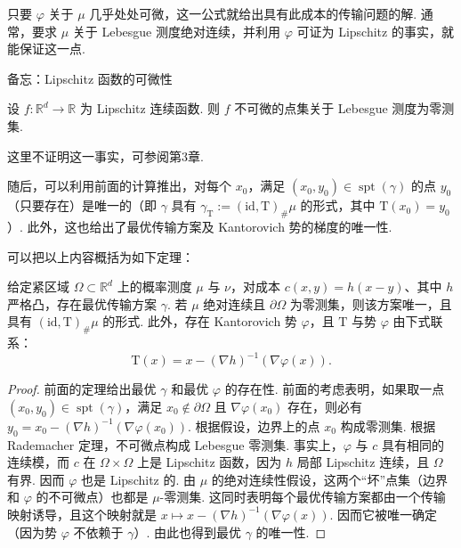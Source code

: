 只要 $\varphi$ 关于 $\mu$ 几乎处处可微，这一公式就给出具有此成本的传输问题的解. 通常，要求 $\mu$ 关于 Lebesgue 测度绝对连续，并利用 $\varphi$ 可证为 Lipschitz 的事实，就能保证这一点.

\begin{sourcebox}{备忘：Lipschitz 函数的可微性}\label{box:1.9}
\begin{theorem*}[Rademacher]
设 $f:\mathbb R^d\to\mathbb R$ 为 Lipschitz 连续函数. 则 $f$ 不可微的点集关于 Lebesgue 测度为零测集.
\end{theorem*}

这里不证明这一事实，可参阅\cite{b12}第3章.
\end{sourcebox}

随后，可以利用前面的计算推出，对每个 $x_0$，满足 $(x_0,y_0)\in\operatorname{spt}(\gamma)$ 的点 $y_0$（只要存在）是唯一的（即 $\gamma$ 具有 $\gamma_\mathrm{T}:=(\mathrm{id},\mathrm{T})_\#\mu$ 的形式，其中 $\mathrm{T}(x_0)=y_0$）. 此外，这也给出了最优传输方案及 Kantorovich 势的梯度的唯一性.

可以把以上内容概括为如下定理：

\begin{theorem}\label{obj:1.17}
给定紧区域 $\Omega\subset\mathbb R^d$ 上的概率测度 $\mu$ 与 $\nu$，对成本 $c(x,y)=h(x-y)$、其中 $h$ 严格凸，存在最优传输方案 $\gamma$. 若 $\mu$ 绝对连续且 $\partial\Omega$ 为零测集，则该方案唯一，且具有 $(\mathrm{id},\mathrm{T})_\#\mu$ 的形式. 此外，存在 Kantorovich 势 $\varphi$，且 $\mathrm{T}$ 与势 $\varphi$ 由下式联系：
\[
\mathrm{T}(x)=x-(\nabla h)^{-1}(\nabla\varphi(x)).
\]
\end{theorem}
\begin{proof}
前面的定理给出最优 $\gamma$ 和最优 $\varphi$ 的存在性. 前面的考虑表明，如果取一点 $(x_0,y_0)\in\operatorname{spt}(\gamma)$，满足 $x_0\notin\partial\Omega$ 且 $\nabla\varphi(x_0)$ 存在，则必有 $y_0=x_0-(\nabla h)^{-1}(\nabla\varphi(x_0))$. 根据假设，边界上的点 $x_0$ 构成零测集. 根据 Rademacher 定理，不可微点构成 Lebesgue 零测集. 事实上，$\varphi$ 与 $c$ 具有相同的连续模，而 $c$ 在 $\Omega\times\Omega$ 上是 Lipschitz 函数，因为 $h$ 局部 Lipschitz 连续，且 $\Omega$ 有界. 因而 $\varphi$ 也是 Lipschitz 的. 由 $\mu$ 的绝对连续性假设，这两个“坏”点集（边界和 $\varphi$ 的不可微点）也都是 $\mu$-零测集. 这同时表明每个最优传输方案都由一个传输映射诱导，且这个映射就是 $x\mapsto x-(\nabla h)^{-1}(\nabla\varphi(x))$. 因而它被唯一确定（因为势 $\varphi$ 不依赖于 $\gamma$）. 由此也得到最优 $\gamma$ 的唯一性.
\end{proof}

